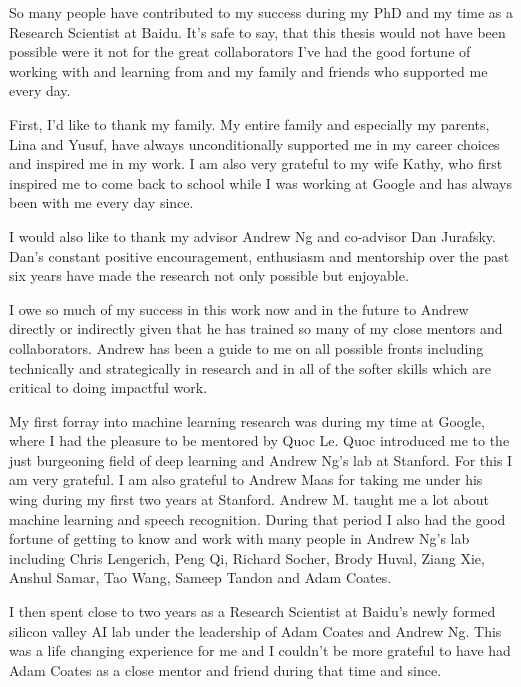 

So many people have contributed to my success during my PhD and my time as a
Research Scientist at Baidu. It's safe to say, that this thesis would not have
been possible were it not for the great collaborators I've had the good
fortune of working with and learning from and my family and friends who
supported me every day.

First, I'd like to thank my family. My entire family and especially my parents,
Lina and Yusuf, have always unconditionally supported me in my career choices
and inspired me in my work. I am also very grateful to my wife Kathy, who first
inspired me to come back to school while I was working at Google and has always
been with me every day since.

I would also like to thank my advisor Andrew Ng and co-advisor Dan Jurafsky.
Dan's constant positive encouragement, enthusiasm and mentorship over the past
six years have made the research not only possible but enjoyable.

I owe so much of my success in this work now and in the future to Andrew
directly or indirectly given that he has trained so many of my close mentors
and collaborators. Andrew has been a guide to me on all possible fronts
including technically and strategically in research and in all of the softer
skills which are critical to doing impactful work.

My first forray into machine learning research was during my time at Google,
where I had the pleasure to be mentored by Quoc Le. Quoc introduced me to the
just burgeoning field of deep learning and Andrew Ng's lab at Stanford. For
this I am very grateful. I am also grateful to Andrew Maas for taking me under
his wing during my first two years at Stanford. Andrew M. taught me a lot about
machine learning and speech recognition. During that period I also had the good
fortune of getting to know and work with many people in Andrew Ng's lab
including Chris Lengerich, Peng Qi, Richard Socher, Brody Huval, Ziang Xie,
Anshul Samar, Tao Wang, Sameep Tandon and Adam Coates.

I then spent close to two years as a Research Scientist at Baidu's newly formed
silicon valley AI lab under the leadership of Adam Coates and Andrew Ng. This
was a life changing experience for me and I couldn't be more grateful to have
had Adam Coates as a close mentor and friend during that time and since.

